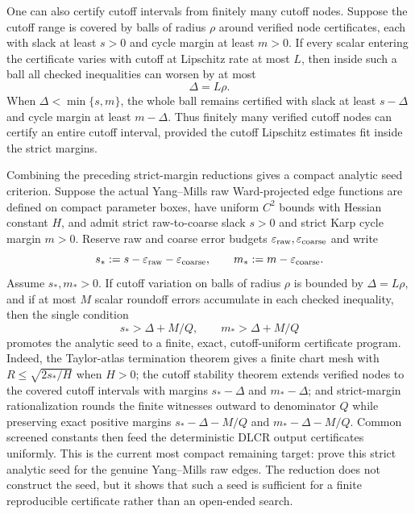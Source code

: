 One can also certify cutoff intervals from finitely many cutoff nodes. Suppose
the cutoff range is covered by balls of radius $\rho$ around verified node
certificates, each with slack at least $s>0$ and cycle margin at least $m>0$.
If every scalar entering the certificate varies with cutoff at Lipschitz rate
at most $L$, then inside such a ball all checked inequalities can worsen by at
most
\[
  \Delta=L\rho .
\]
When $\Delta<\min\{s,m\}$, the whole ball remains certified with slack at
least $s-\Delta$ and cycle margin at least $m-\Delta$. Thus finitely many
verified cutoff nodes can certify an entire cutoff interval, provided the
cutoff Lipschitz estimates fit inside the strict margins.

Combining the preceding strict-margin reductions gives a compact analytic seed
criterion. Suppose the actual Yang--Mills raw Ward-projected edge functions are
defined on compact parameter boxes, have uniform $C^2$ bounds with Hessian
constant $H$, and admit strict raw-to-coarse slack $s>0$ and strict Karp cycle
margin $m>0$. Reserve raw and coarse error budgets
$\varepsilon_{\rm raw},\varepsilon_{\rm coarse}$ and write
\[
  s_*:=s-\varepsilon_{\rm raw}-\varepsilon_{\rm coarse},
  \qquad
  m_*:=m-\varepsilon_{\rm coarse}.
\]
Assume $s_*,m_*>0$. If cutoff variation on balls of radius $\rho$ is bounded
by $\Delta=L\rho$, and if at most $M$ scalar roundoff errors accumulate in
each checked inequality, then the single condition
\[
  s_*>\Delta+M/Q,\qquad m_*>\Delta+M/Q
\]
promotes the analytic seed to a finite, exact, cutoff-uniform certificate
program. Indeed, the Taylor-atlas termination theorem gives a finite chart
mesh with $R\leq \sqrt{2s_*/H}$ when $H>0$; the cutoff stability theorem
extends verified nodes to the covered cutoff intervals with margins
$s_*-\Delta$ and $m_*-\Delta$; and strict-margin rationalization rounds the
finite witnesses outward to denominator $Q$ while preserving exact positive
margins $s_*-\Delta-M/Q$ and $m_*-\Delta-M/Q$. Common screened constants then
feed the deterministic DLCR output certificates uniformly. This is the current
most compact remaining target: prove this strict analytic seed for the genuine
Yang--Mills raw edges. The reduction does not construct the seed, but it shows
that such a seed is sufficient for a finite reproducible certificate rather
than an open-ended search.

